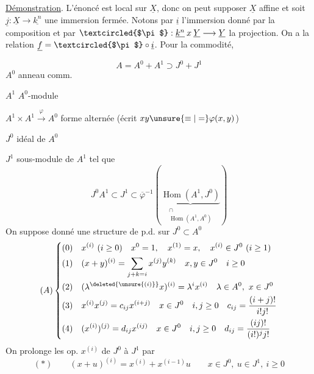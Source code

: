 \uline{Démonstration}. L'énoncé est local sur $\underline X$, donc on peut supposer $\underline X$ affine et soit $\underline j:\underline X\longrightarrow\underline{k^n}$ une immersion fermée. Notons par $\underline i$ l'immersion donné par la composition
et par $\textcircled{$\pi$}:\underline{k^n}\mathbin{x}\underline Y\longrightarrow\underline Y$ la projection. On a la relation $\underline f=\textcircled{$\pi$}\circ\underline i$. Pour la commodité,

\[
A=A^0+A^1\supset J^0+J^1
\]
$A^0$ anneau comm.

$A^1$ $A^0$-module

$A^1\times A^1\xrightarrow{\varphi}A^0$ forme alternée (écrit $xy\unsure{\equiv|=}\varphi(x,y)$)

$J^0$ idéal de $A^0$

$J^1$  sous-module de $A^1$ tel que
\[
J^0A^1\subset J^1\subset\overline\varphi^{-1}\left(\underset{\substack{\cap\\\operatorname{Hom}(A^1,A^0)}}{\underbrace{\operatorname{Hom}(A^1,J^0)}}\right)
\]
On suppose donné une structure de p.d. sur $J^0\subset A^0$
\[
(A)\left\{\begin{aligned}
(0)\quad&x^{(i)}\ (i\geq0)\quad x^0=1,\quad x^{(1)}=x,\quad x^{(i)}\in J^0\ (i\geq1)\\
(1)\quad&(x+y)^{(i)}=\sum_{j+k=i}x^{(j)}y^{(k)}\quad x,y\in J^0\quad i\geq0\\
(2)\quad&(\lambda^{\deleted{\unsure{(i)}}}x)^{(i)}=\lambda^i x^{(i)}\quad\lambda\in A^0,\ x\in J^0\\
(3)\quad&x^{(i)}x^{(j)}=c_{ij}x^{(i+j)}\quad x\in J^0\quad i,j\geq0\quad c_{ij}=\frac{(i+j)!}{i!j!}\\
(4)\quad&(x^{(i)})^{(j)}=d_{ij}x^{(ij)}\quad x\in J^0\quad i,j\geq0\quad d_{ij}=\frac{(ij)!}{(i!)^j j!}
\end{aligned}\right.
\]
On prolonge les op. $x^{(i)}$ de $J^0$ à  $J^1$ par
\[
(*)\qquad(x+u)^{(i)}=x^{(i)}+x^{(i-1)}u\qquad x\in J^0,\ u\in J^1,\ i\geq0
\]

